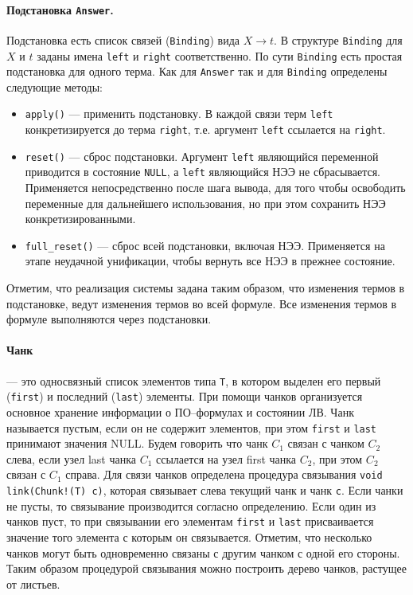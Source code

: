 \paragraph{Подстановка \texttt{Answer}.} Подстановка есть список связей (\texttt{Binding}) вида $X \rightarrow t$. В структуре \texttt{Binding} для $X$ и $t$ заданы имена \texttt{left} и \texttt{right} соответственно. По сути \texttt{Binding} есть простая подстановка для одного терма. Как для \texttt{Answer} так и для \texttt{Binding} определены следующие методы:
\begin{itemize}
\item{\texttt{apply()}} --- применить подстановку. В каждой связи терм \texttt{left} конкретизируется до терма \texttt{right}, т.е. аргумент \texttt{left} ссылается на \texttt{right}.
\item{\texttt{reset()}} --- сброс подстановки. Аргумент \texttt{left} являющийся переменной приводится в состояние \texttt{NULL}, а \texttt{left} являющийся НЭЭ не сбрасывается. Применяется непосредственно после шага вывода, для того чтобы освободить переменные для дальнейшего использования, но при этом сохранить НЭЭ конкретизированными.
\item{\texttt{full\_reset()}} --- сброс всей подстановки, включая НЭЭ. Применяется на этапе неудачной унификации, чтобы вернуть все НЭЭ в прежнее состояние.
\end{itemize}

Отметим, что реализация системы задана таким образом, что изменения термов в подстановке, ведут изменения термов во всей формуле. Все изменения термов в формуле выполняются через подстановки.

\paragraph{Чанк} --- это односвязный список элементов типа {\tt T}, в котором выделен его первый ({\tt first}) и последний ({\tt last}) элементы. При помощи чанков организуется основное хранение информации о ПО--формулах и состоянии ЛВ. Чанк называется пустым, если он не содержит элементов, при этом \texttt{first} и \texttt{last} принимают значения NULL. Будем говорить что чанк $C_1$ связан с чанком $C_2$ слева, если узел last чанка $C_1$ ссылается на узел first чанка $C_2$, при этом $C_2$ связан с $C_1$ справа. Для связи чанков определена процедура связывания {\tt void link(Chunk!(T) c)}, которая связывает слева текущий чанк и чанк {\tt c}. Если чанки не пусты, то связывание производится согласно определению. Если один из чанков пуст, то при связывании его элементам \texttt{first} и \texttt{last} присваивается значение того элемента с которым он связывается. Отметим, что несколько чанков могут быть одновременно связаны с другим чанком с одной его стороны. Таким образом процедурой связывания можно построить дерево чанков, растущее от листьев.

